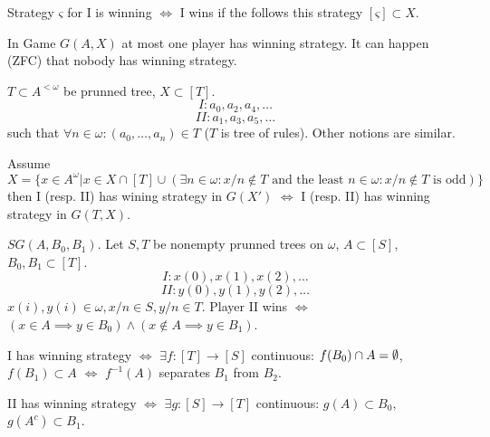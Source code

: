\documentclass[12pt]{article}					%
\begin{document}
\begin{definice}
	Strategy $ς$ for I is winning $\Leftrightarrow$ I wins if the follows this strategy $[ς] \subset X$.
\end{definice}

\begin{poznamka}
	In Game $G(A, X)$ at most one player has winning strategy. It can happen (ZFC) that nobody has winning strategy.
\end{poznamka}

\begin{definice}
	$T \subset A^{<ω}$ be prunned tree, $X \subset [T]$. 
	$$ I: a_0, a_2, a_4, … $$
	$$ II: a_1, a_3, a_5, … $$
	such that $\forall n \in ω: (a_0, …, a_n) \in T$ ($T$ is tree of rules). Other notions are similar.
\end{definice}

\begin{poznamka}
	Assume $X = \{x \in A^ω | x \in X \cap [T] \cup (\exists n \in ω: x / n \notin T \text{ and the least } n \in ω: x / n \notin T \text{ is odd})\}$ then I (resp. II) has wining strategy in $G(X')$ $\Leftrightarrow$ I (resp. II) has winning strategy in $G(T, X)$.
\end{poznamka}

\begin{priklady}
	$SG(A, B_0, B_1)$. Let $S, T$ be nonempty prunned trees on $ω$, $A \subset [S]$, $B_0, B_1 \subset [T]$.
	$$ I: x(0), x(1), x(2), … $$
	$$ II: y(0), y(1), y(2), … $$
	$x(i), y(i) \in ω, x / n \in S, y / n \in T$. Player II wins $\Leftrightarrow$ $(x \in A \implies y \in B_0) \land (x \notin A \implies y \in B_1)$.

	I has winning strategy $\Leftrightarrow$ $\exists f: [T] \rightarrow [S]$ continuous: $f(B_0) \cap A = \emptyset$, $f(B_1) \subset A$ $\Leftrightarrow$ $f^{-1}(A)$ separates $B_1$ from $B_2$.

	II has winning strategy $\Leftrightarrow$ $\exists g: [S] \rightarrow [T]$ continuous: $g(A) \subset B_0$, $g(A^c) \subset B_1$.
\end{priklady}
\end{document}
